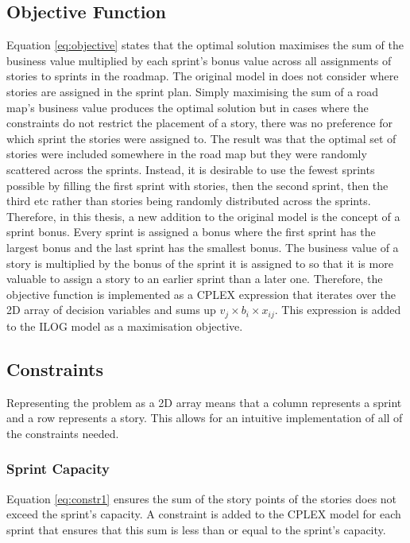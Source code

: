 \subsection{Objective Function}
Equation \ref{eq:objective} states that the optimal solution maximises the sum of the business value multiplied by each sprint's bonus value across all assignments of stories to sprints in the roadmap. The original model in \citet{golfarelli2012sprint} does not consider where stories are assigned in the sprint plan. Simply maximising the sum of a road map's business value produces the optimal solution but in cases where the constraints do not restrict the placement of a story, there was no preference for which sprint the stories were assigned to. The result was that the optimal set of stories were included somewhere in the road map but they were randomly scattered across the sprints. Instead, it is desirable to use the fewest sprints possible by filling the first sprint with stories, then the second sprint, then the third etc rather than stories being randomly distributed across the sprints. Therefore, in this thesis, a new addition to the original model is the concept of a sprint bonus. Every sprint is assigned a bonus where the first sprint has the largest bonus and the last sprint has the smallest bonus. The business value of a story is multiplied by the bonus of the sprint it is assigned to so that it is more valuable to assign a story to an earlier sprint than a later one. Therefore, the objective function is implemented as a CPLEX expression that iterates over the 2D array of decision variables and sums up $v_j \times b_i \times x_{ij}$. This expression is added to the ILOG model as a maximisation objective.

\subsection{Constraints}

Representing the problem as a 2D array means that a column represents a sprint and a row represents a story. This allows for an intuitive implementation of all of the constraints needed.

\subsubsection{Sprint Capacity}
Equation \ref{eq:constr1} ensures the sum of the story points of the stories does not exceed the sprint's capacity. A constraint is added to the CPLEX model for each sprint that ensures that this sum is less than or equal to the sprint's capacity.

